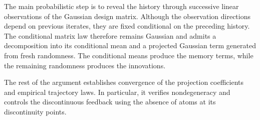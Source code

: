 The main probabilistic step is to reveal the history through
successive linear observations of the Gaussian design matrix.
Although the observation directions depend on previous
iterates, they are fixed conditional on the preceding history.
The conditional matrix law therefore remains Gaussian and
admits a decomposition into its conditional mean and a
projected Gaussian term generated from fresh randomness.
The conditional means produce the memory terms, while the
remaining randomness produces the innovations.

The rest of the argument establishes convergence of the
projection coefficients and empirical trajectory laws.
In particular, it verifies nondegeneracy and controls the
discontinuous feedback using the absence of atoms at its
discontinuity points.
